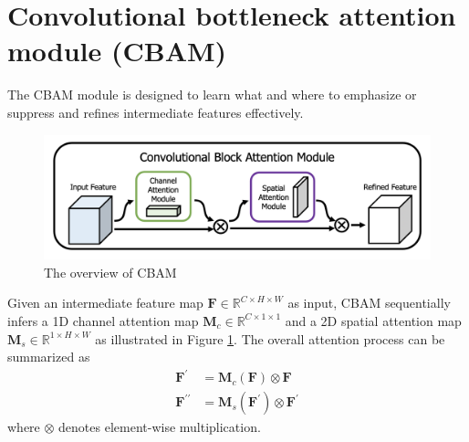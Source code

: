 \section{Convolutional bottleneck attention module (CBAM)}
The CBAM\cite{CBAM} module is designed to learn what and where to emphasize or suppress and refines intermediate features effectively.
\begin{figure}[h!]
	\centering
	\includegraphics[width=\linewidth]{img/cbam}
	\caption{The overview of CBAM \cite{CBAM}}
	\label{fig:cbam}
\end{figure}

Given an intermediate feature map $ \textbf{F} \in \mathbb{R}^{C\times H \times W} $ as input, CBAM sequentially infers a 1D channel attention map $ \textbf{M}_c \in \mathbb{R}^{C\times 1 \times 1} $ and a 2D spatial attention map $ \textbf{M}_s \in \mathbb{R}^{1\times H \times W} $ as illustrated in Figure \ref{fig:cbam}. The overall attention process can be summarized as 
\begin{equation}
	\begin{split}
		\textbf{F}^\prime &= \textbf{M}_c (\textbf{F}) \otimes \textbf{F}\\
		\textbf{F}^{\prime \prime} &= \textbf{M}_s(\textbf{F}^\prime)\otimes \textbf{F}^\prime
	\end{split}
\end{equation} 
where $ \otimes $ denotes element-wise multiplication.



